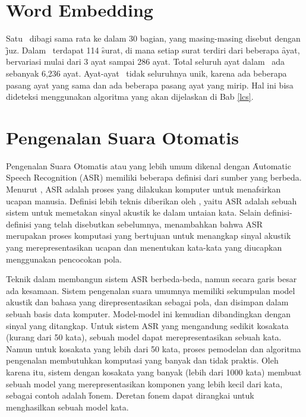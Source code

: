 \section{Word Embedding}

Satu \quran~dibagi sama rata ke dalam 30 bagian, yang masing-masing disebut dengan \f{juz}. Dalam \quran~terdapat 114 \f{surat}, di mana setiap surat terdiri dari beberapa \f{ayat}, bervariasi mulai dari 3 ayat sampai 286 ayat. Total seluruh ayat dalam \quran~ada sebanyak 6,236 ayat. Ayat-ayat \quran~tidak seluruhnya unik, karena ada beberapa pasang ayat yang sama dan ada beberapa pasang ayat yang mirip. Hal ini bisa dideteksi menggunakan algoritma yang akan dijelaskan di Bab \ref{lcs}.

\section{Pengenalan Suara Otomatis}
Pengenalan Suara Otomatis atau yang lebih umum dikenal dengan \f{Automatic Speech Recognition} (ASR) memiliki beberapa definisi dari sumber yang berbeda. Menurut \cite{forsberg2003speech}, ASR adalah proses yang dilakukan komputer untuk menafsirkan ucapan manusia. Definisi lebih teknis diberikan oleh \cite{Jurafsky:2009:SLP:1214993}, yaitu ASR adalah sebuah sistem untuk memetakan sinyal akustik ke dalam untaian kata. Selain definisi-definisi yang telah disebutkan sebelumnya, \cite{chigier1997automatic} menambahkan bahwa ASR merupakan proses komputasi yang bertujuan untuk menangkap sinyal akustik yang merepresentasikan ucapan dan menentukan kata-kata yang diucapkan menggunakan pencocokan pola.

Teknik dalam membangun sistem ASR berbeda-beda, namun secara garis besar ada kesamaan. Sistem pengenalan suara umumnya memiliki sekumpulan model akustik dan bahasa yang direpresentasikan sebagai pola, dan disimpan dalam sebuah basis data komputer. Model-model ini kemudian dibandingkan dengan sinyal yang ditangkap. Untuk sistem ASR yang mengandung sedikit kosakata (kurang dari 50 kata), sebuah model dapat merepresentasikan sebuah kata. Namun untuk kosakata yang lebih dari 50 kata, proses pemodelan dan algoritma pengenalan membutuhkan komputasi yang banyak dan tidak praktis. Oleh karena itu, sistem dengan kosakata yang banyak (lebih dari 1000 kata) membuat sebuah model yang merepresentasikan komponen yang lebih kecil dari kata, sebagai contoh adalah \f{fonem}. Deretan fonem dapat dirangkai untuk menghasilkan sebuah model kata.

